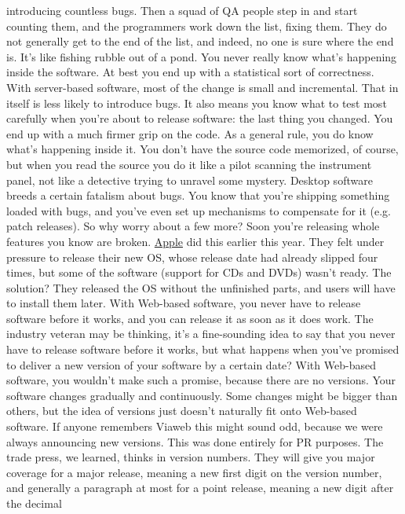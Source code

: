 introducing countless bugs.  Then a squad of QA people step in and
start counting them, and the programmers work down the list, fixing
them.  They do not generally get to the end of the list, and indeed,
no one is sure where the end is.  It's like fishing rubble out of
a pond.  You never really know what's happening inside the software.
At best you end up with a statistical sort of correctness.
With server-based software, most of the change is small and
incremental.  That in itself is less likely to introduce bugs.  It
also means you know what to test most carefully when you're about
to release software: the last thing you changed.  You end up with
a much firmer grip on the code.  As a general rule, you do know
what's happening inside it.  You don't have the source code memorized,
of course, but when you read the source you do it like a pilot
scanning the instrument panel, not like a detective trying to
unravel some mystery.
Desktop software breeds a certain fatalism about bugs.  You know
that you're shipping something loaded with bugs, and you've even
set up mechanisms to compensate for it (e.g. patch releases).  So
why worry about a few more?  Soon you're releasing whole features
you know are broken.  
\href{http://news.cnet.com/news/0-1006-200-5195914.html}{Apple} 
did this earlier this year.  They felt
under pressure to release their new OS, whose release date had
already slipped four times, but some of the software (support for
CDs and DVDs) wasn't ready. The solution?  They released the OS
without the unfinished parts, and users will have to install them
later.
With Web-based software, you never have to release software before
it works, and you can release it as soon as it does work.
The industry veteran may be thinking, it's a fine-sounding idea to
say that you never have to release software before it works, but
what happens when you've promised to deliver a new version of your
software by a certain date?  With Web-based software, you wouldn't
make such a promise, because there are no versions.  Your software
changes gradually and continuously.  Some changes might be bigger
than others, but the idea of versions just doesn't naturally fit
onto Web-based software.
If anyone remembers Viaweb this might sound odd, because we were
always announcing new versions.  This was done entirely for PR
purposes.  The trade press, we learned, thinks in version numbers.
They will give you major coverage for a major release, meaning a
new first digit on the version number, and generally a paragraph
at most for a point release, meaning a new digit after the decimal
